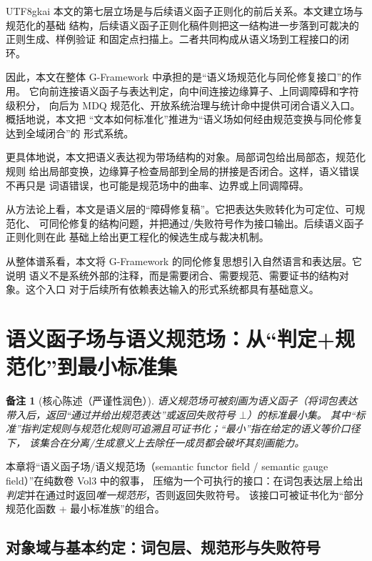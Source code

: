 \documentclass[12pt]{article}
\newtheorem{remark}{备注}[section]
\newcommand{\GFramework}{\textsf{G-Framework}}
\begin{document}
\begin{CJK*}{UTF8}{gkai}
本文的第七层立场是与后续语义函子正则化的前后关系。本文建立场与规范化的基础
结构，后续语义函子正则化稿件则把这一结构进一步落到可裁决的正则生成、样例验证
和固定点扫描上。二者共同构成从语义场到工程接口的闭环。

因此，本文在整体 \GFramework{} 中承担的是“语义场规范化与同伦修复接口”的作用。
它向前连接语义函子与表达判定，向中间连接边缘算子、上同调障碍和字符级积分，
向后为 MDQ 规范化、开放系统治理与统计命中提供可闭合语义入口。概括地说，本文把
“文本如何标准化”推进为“语义场如何经由规范变换与同伦修复达到全域闭合”的
形式系统。

更具体地说，本文把语义表达视为带场结构的对象。局部词包给出局部态，规范化规则
给出局部变换，边缘算子检查局部到全局的拼接是否闭合。这样，语义错误不再只是
词语错误，也可能是规范场中的曲率、边界或上同调障碍。

从方法论上看，本文是语义层的“障碍修复稿”。它把表达失败转化为可定位、可规范化、
可同伦修复的结构问题，并把通过/失败符号作为接口输出。后续语义函子正则化则在此
基础上给出更工程化的候选生成与裁决机制。

从整体谱系看，本文将 G-Framework 的同伦修复思想引入自然语言和表达层。它说明
语义不是系统外部的注释，而是需要闭合、需要规范、需要证书的结构对象。这个入口
对于后续所有依赖表达输入的形式系统都具有基础意义。

\setcounter{tocdepth}{3}
\setcounter{secnumdepth}{3}
\tableofcontents
\clearpage

\section{语义函子场与语义规范场：从“判定+规范化”到最小标准集}

\begin{remark}[核心陈述（严谨性润色）]
语义规范场可被刻画为语义函子（将词包表达带入后，返回“通过并给出规范表达”或返回失败符号 $\bot$）的标准最小集。
其中“标准”指判定规则与规范化规则可追溯且可证书化；“最小”指在给定的语义等价口径下，
该集合在分离/生成意义上去除任一成员都会破坏其刻画能力。
\end{remark}

本章将“语义函子场/语义规范场（semantic functor field / semantic gauge field）”在纯数卷 Vol3 中的叙事，
压缩为一个可执行的接口：在词包表达层上给出\emph{判定}并在通过时返回\emph{唯一规范形}，否则返回失败符号。
该接口可被证书化为“部分规范化函数 + 最小标准族”的组合。

\subsection{对象域与基本约定：词包层、规范形与失败符号}
\label{subsec:tex20-domain}


\end{CJK*}
\end{document}

